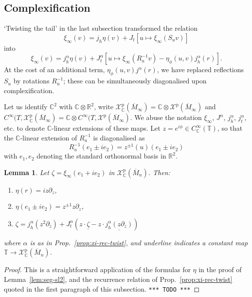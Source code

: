 \documentclass{article}
\def\MISS{\texttt{*** TODO ***}}
\def\RR{\mathbb{R}}
\def\CC{\mathbb{C}}
\def\TT{\mathbb{T}}
\def\XX{\mathcal{X}}
\def\p{\mathrm{p}}
\newtheorem{lem}{Lemma}
\theoremstyle{definition}
\begin{document}
\subsection{Complexification}
`Twisting the tail' in the last subsection
transformed the relation
$$ \xi_\infty(v) = j_h\eta(v) + J_t\left[ u \mapsto \xi_\infty(S_uv) \right] $$
into
$$ \xi_\infty(v) = j^\alpha_h\eta(v) + J_t^\alpha \left[ u \mapsto \xi_\infty(R_u^{-1}v) - 
\eta_\phi(u,v)j^\alpha_h(r) \right].
$$
At the cost of an additional term, $\eta_\phi(u,v)j^\alpha(r)$,
we have replaced reflections $S_u$ by rotations $R^{-1}_u$; these can be
simultaneously diagonalised upon complexification.

Let us identify $\CC^2$ with $\CC\otimes\RR^2$,
write $\XX_\CC^\p(\overline M_\infty) = \CC \otimes \XX^\p(\overline M_\infty)$
and $C^\infty(T, \XX_\CC^\p(\overline M_\infty) = \CC\otimes C^\infty(T, \XX^\p(\overline M_\infty)$.
We abuse the notation $\xi_\infty$, $J^\alpha$, $j_h^\alpha$, $j_t^\alpha$, etc.
to denote $\CC$-linear extensions of these maps.
Let
$z = e^{i\phi} \in C^\infty_\CC(\TT)$,
so that the $\CC$-linear extension of $R^{-1}_u$ is diagonalised as
$$
R^{-1}_u (e_1 \pm ie_2) = z^{\pm1}(u) (e_1\pm i e_2)
$$
with $e_1,e_2$ denoting the standard orthonormal basis in $\RR^2$.
\begin{lem}\label{lem:zeta}
Let $\zeta = \xi_\infty(e_1 + ie_2)$ in $\XX^\p_\CC(\overline M_n)$. Then:
\begin{enumerate}
\item
$\eta(r) = iz\partial_z$,
\item 
$\eta(e_1\pm ie_2) = z^{\pm 1} z\partial_z$,
\item
        $ \zeta = j^\alpha_h (z^2\partial_z) + J^\alpha_t \left( z  \cdot \underline{\zeta}
        -z  \cdot \underline{j^\alpha_h (z\partial_z)} \right)$
 \end{enumerate}
 where $\alpha$ is as in Prop.~\ref{prop:xi-rec-twist}, and
 underline indicates a constant map $\TT \to \XX^\p_\CC(\overline M_n)$.
\end{lem}
\begin{proof} This is a straightforward application 
        of the formulas for $\eta$
        in the proof of Lemma~\ref{lem:seg-sl2},
        and the recurrence relation of Prop.~\ref{prop:xi-rec-twist} quoted
        in the first paragraph of this subsection. \MISS
\end{proof}
\end{document}
